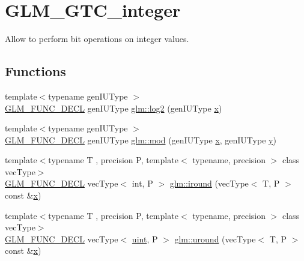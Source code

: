 \hypertarget{group__gtc__integer}{}\section{G\+L\+M\+\_\+\+G\+T\+C\+\_\+integer}
\label{group__gtc__integer}


Allow to perform bit operations on integer values.  


\subsection*{Functions}
\begin{DoxyCompactItemize}
\item 
{\footnotesize template$<$typename gen\+I\+U\+Type $>$ }\\\mbox{\hyperlink{setup_8hpp_ab2d052de21a70539923e9bcbf6e83a51}{G\+L\+M\+\_\+\+F\+U\+N\+C\+\_\+\+D\+E\+CL}} gen\+I\+U\+Type \mbox{\hyperlink{group__gtc__integer_ga9bd682e74bfacb005c735305207ec417}{glm\+::log2}} (gen\+I\+U\+Type \mbox{\hyperlink{glad_8h_a92d0386e5c19fb81ea88c9f99644ab1d}{x}})
\item 
{\footnotesize template$<$typename gen\+I\+U\+Type $>$ }\\\mbox{\hyperlink{setup_8hpp_ab2d052de21a70539923e9bcbf6e83a51}{G\+L\+M\+\_\+\+F\+U\+N\+C\+\_\+\+D\+E\+CL}} gen\+I\+U\+Type \mbox{\hyperlink{group__gtc__integer_ga75c6fd2a143fc44e5f7b871abad539e0}{glm\+::mod}} (gen\+I\+U\+Type \mbox{\hyperlink{glad_8h_a92d0386e5c19fb81ea88c9f99644ab1d}{x}}, gen\+I\+U\+Type \mbox{\hyperlink{glad_8h_a66ddd433d2cacfe27f5906b7e86faeed}{y}})
\item 
{\footnotesize template$<$typename T , precision P, template$<$ typename, precision $>$ class vec\+Type$>$ }\\\mbox{\hyperlink{setup_8hpp_ab2d052de21a70539923e9bcbf6e83a51}{G\+L\+M\+\_\+\+F\+U\+N\+C\+\_\+\+D\+E\+CL}} vec\+Type$<$ int, P $>$ \mbox{\hyperlink{group__gtc__integer_ga0a42ffb863cc980e91f98d2f5766de20}{glm\+::iround}} (vec\+Type$<$ T, P $>$ const \&\mbox{\hyperlink{glad_8h_a92d0386e5c19fb81ea88c9f99644ab1d}{x}})
\item 
{\footnotesize template$<$typename T , precision P, template$<$ typename, precision $>$ class vec\+Type$>$ }\\\mbox{\hyperlink{setup_8hpp_ab2d052de21a70539923e9bcbf6e83a51}{G\+L\+M\+\_\+\+F\+U\+N\+C\+\_\+\+D\+E\+CL}} vec\+Type$<$ \mbox{\hyperlink{group__core__precision_ga4fd29415871152bfb5abd588334147c8}{uint}}, P $>$ \mbox{\hyperlink{group__gtc__integer_gab61b8546aafdf58f119eb892b212607c}{glm\+::uround}} (vec\+Type$<$ T, P $>$ const \&\mbox{\hyperlink{glad_8h_a92d0386e5c19fb81ea88c9f99644ab1d}{x}})

\end{DoxyCompactItemize}
